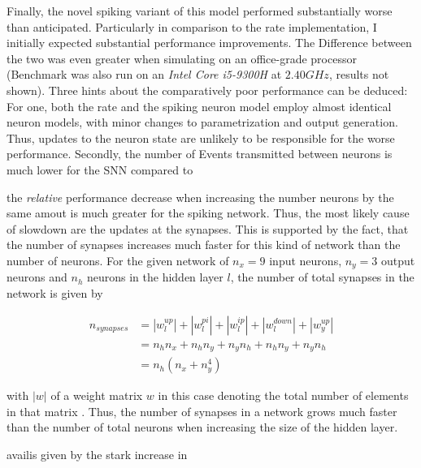 Finally, the novel spiking variant of this model performed substantially worse than anticipated. Particularly in
comparison to the rate implementation, I initially expected substantial performance improvements. The Difference between
the two was even greater when simulating on an office-grade processor (Benchmark was also run on an \textit{Intel Core
    i5-9300H} at $2.40GHz$, results not shown). Three hints about the comparatively poor performance can be deduced: For
one, both the rate and the spiking neuron model employ almost identical neuron models, with minor changes to
parametrization and output generation. Thus, updates to the neuron state are unlikely to be responsible for the worse
performance. Secondly, the number of Events transmitted between neurons is much lower for the SNN compared to

the \textit{relative} performance decrease when increasing the number neurons by the same amout is much greater for the
spiking network. Thus, the most likely cause of slowdown are the updates at the synapses. This is supported by the fact,
that the number of synapses increases much faster for this kind of network than the number of neurons. For the given
network of $n_{x} = 9$ input neurons, $n_y = 3$ output neurons and $n_{h}$ neurons in the hidden layer $l$, the number
of total synapses in the network is given by

\begin{align}
    n_{synapses} & = |w_{l}^{up}| + |w_{l}^{pi}| + |w_{l}^{ip}| + |w_{l}^{down}| + |w_{y}^{up}| \\
                 & = n_h n_x + n_h n_y + n_y n_h  + n_h n_y + n_y  n_h                          \\
                 & = n_h (n_x + n_y^4)
\end{align}

with $|w|$ of a weight matrix $w$ in this case denoting the total number of elements in that matrix . Thus, the number of synapses in a network grows much faster than the number of total
neurons when increasing the size of the hidden layer.

availis given by the stark increase in







